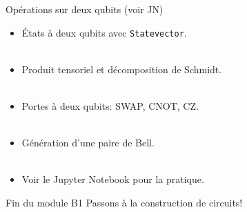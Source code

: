 \documentclass[aspectratio=169,12pt]{beamer}
\begin{document}
\begin{frame}{Opérations sur deux qubits (voir JN)}
  \begin{itemize}
    \item États à deux qubits avec \texttt{Statevector}.\\~\\
    \item Produit tensoriel et décomposition de Schmidt.\\~\\
    \item Portes à deux qubits: SWAP, CNOT, CZ.\\~\\
    \item Génération d'une paire de Bell.\\~\\
    \item Voir le Jupyter Notebook pour la pratique.
  \end{itemize}
\end{frame}

\begin{frame}{Fin du module B1}
  \centering
  \vfill
  Passons à la construction de circuits!
  \vfill
\end{frame}
\end{document}
